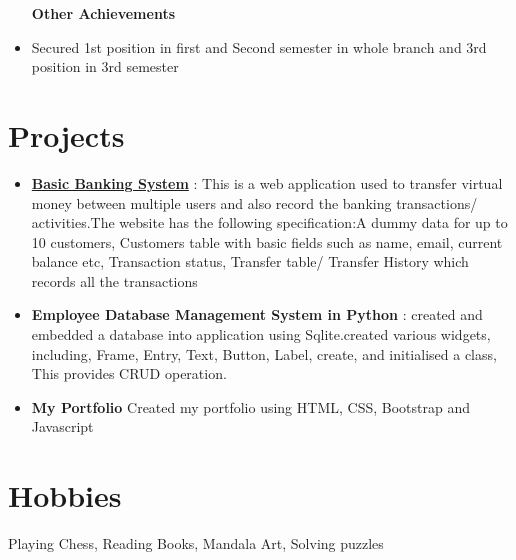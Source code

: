 \documentclass[margin, centered]{res}
\begin{document}
\begin{resume}
\begin{itemize}[leftmargin=*]
 
 \textbf{Other Achievements}
 \item Secured 1st position in first and Second semester in whole branch and 3rd position in 3rd semester
\end{itemize}
\section{Projects}
\begin{itemize}[leftmargin=*]
 \item \textbf{\href{https://github.com/tannuchoudhary/basic_banking_system}{Basic Banking System}} : This is a web application used to transfer virtual money between multiple users and also record the banking transactions/ activities.The website has the following specification:A dummy data for up to 10 customers, Customers table with basic fields such as name, email, current balance etc, Transaction status, Transfer table/ Transfer History which records all the transactions
 \item \textbf{Employee Database Management System in Python} : created and embedded a database into application using Sqlite.created various widgets, including, Frame, Entry, Text, Button, Label, create, and initialised a class, This provides CRUD operation.
 \item \textbf{My Portfolio} Created my portfolio using HTML, CSS, Bootstrap and Javascript
\end{itemize}



\section{Hobbies}
Playing Chess, Reading Books, Mandala Art, Solving puzzles


\end{resume}
\end{document}
